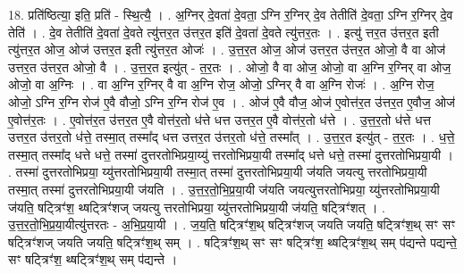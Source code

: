 \documentclass[17pt]{extarticle}
\begin{document}
18. प्रति॑ष्ठित्या॒ इति॒ प्रति॑ - स्थि॒त्यै॒ । . अ॒ग्निर् दे॒वता॑ दे॒वता॒ ऽग्नि र॒ग्निर् दे॒व तेतीति॑ दे॒वता॒ ऽग्नि र॒ग्निर् दे॒व तेति॑ । . दे॒व तेतीति॑ दे॒वता॑ दे॒वते त्यु॑त्तर॒त उ॑त्तर॒त इति॑ दे॒वता॑ दे॒वते त्यु॑त्तर॒तः । . इत्यु॑ त्तर॒त उ॑त्तर॒त इती त्यु॑त्तर॒त ओज॒ ओज॑ उत्तर॒त इती त्यु॑त्तर॒त ओजः॑ । . उ॒त्त॒र॒त ओज॒ ओज॑ उत्तर॒त उ॑त्तर॒त ओजो॒ वै वा ओज॑ उत्तर॒त उ॑त्तर॒त ओजो॒ वै । . उ॒त्त॒र॒त इत्यु॑त् - त॒र॒तः । . ओजो॒ वै वा ओज॒ ओजो॒ वा अ॒ग्नि र॒ग्निर् वा ओज॒ ओजो॒ वा अ॒ग्निः । . वा अ॒ग्नि र॒ग्निर् वै वा अ॒ग्नि रोज॒ ओजो॒ ऽग्निर् वै वा अ॒ग्नि रोजः॑ । . अ॒ग्नि रोज॒ ओजो॒ ऽग्नि र॒ग्नि रोज॑ ए॒वै वौजो॒ ऽग्नि र॒ग्नि रोज॑ ए॒व । . ओज॑ ए॒वै वौज॒ ओज॑ ए॒वोत्त॑र॒त उ॑त्तर॒त ए॒वौज॒ ओज॑ ए॒वोत्त॑र॒तः । . ए॒वोत्त॑र॒त उ॑त्तर॒त ए॒वै वोत्त॑र॒तो ध॑त्ते धत्त उत्तर॒त ए॒वै वोत्त॑र॒तो ध॑त्ते । . उ॒त्त॒र॒तो ध॑त्ते धत्त उत्तर॒त उ॑त्तर॒तो ध॑त्ते॒ तस्मा॒त् तस्मा᳚द् धत्त उत्तर॒त उ॑त्तर॒तो ध॑त्ते॒ तस्मा᳚त् । . उ॒त्त॒र॒त इत्यु॑त् - त॒र॒तः । . ध॒त्ते॒ तस्मा॒त् तस्मा᳚द् धत्ते धत्ते॒ तस्मा॑ दुत्तरतोभिप्रया॒य्यु॑ त्तरतोभिप्रया॒यी तस्मा᳚द् धत्ते धत्ते॒ तस्मा॑ दुत्तरतोभिप्रया॒यी । . तस्मा॑ दुत्तरतोभिप्रया॒ य्यु॑त्तरतोभिप्रया॒यी तस्मा॒त् तस्मा॑ दुत्तरतोभिप्रया॒यी ज॑यति जयत्यु त्तरतोभिप्रया॒यी तस्मा॒त् तस्मा॑ दुत्तरतोभिप्रया॒यी ज॑यति । . उ॒त्त॒र॒तो॒भि॒प्र॒या॒यी ज॑यति जयत्युत्तरतोभिप्रया॒ य्यु॑त्तरतोभिप्रया॒यी ज॑यति॒ षट्त्रिꣳ॑श॒ थ्षट्त्रिꣳ॑शज् जयत्यु त्तरतोभिप्रया॒ य्यु॑त्तरतोभिप्रया॒यी ज॑यति॒ षट्त्रिꣳ॑शत् । . उ॒त्त॒र॒तो॒भि॒प्र॒या॒यीत्यु॑त्तरतः - अ॒भि॒प्र॒या॒यी । . ज॒य॒ति॒ षट्त्रिꣳ॑श॒थ् षट्त्रिꣳ॑शज् जयति जयति॒ षट्त्रिꣳ॑श॒थ् सꣳ सꣳ षट्त्रिꣳ॑शज् जयति जयति॒ षट्त्रिꣳ॑श॒थ् सम् । . षट्त्रिꣳ॑श॒थ् सꣳ सꣳ षट्त्रिꣳ॑श॒ थ्षट्त्रिꣳ॑श॒थ् सम् प॑द्यन्ते पद्यन्ते॒ सꣳ षट्त्रिꣳ॑श॒ थ्षट्त्रिꣳ॑श॒थ् सम् प॑द्यन्ते । \newline
\end{document}
